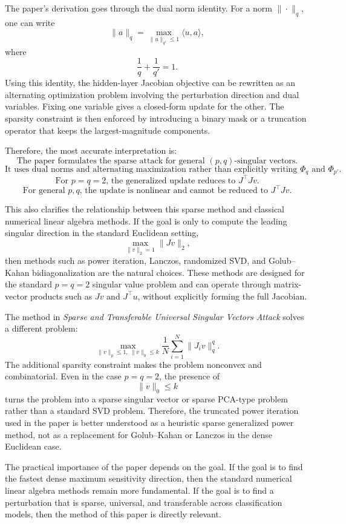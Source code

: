 \documentclass{article}
\begin{document}
The paper's derivation goes through the dual norm identity. For a norm \(\|\cdot\|_q\), one can write
\[
    \|a\|_q
    =
    \max_{\|u\|_{q'}\leq 1}
    \langle u,a\rangle,
\]
where
\[
    \frac{1}{q}+\frac{1}{q'}=1.
\]
Using this identity, the hidden-layer Jacobian objective can be rewritten as an alternating optimization problem involving the perturbation direction and dual variables. Fixing one variable gives a closed-form update for the other. The sparsity constraint is then enforced by introducing a binary mask or a truncation operator that keeps the largest-magnitude components.

Therefore, the most accurate interpretation is:
\[
    \boxed{
    \text{The paper formulates the sparse attack for general }(p,q)\text{-singular vectors.}
    }
\]
\[
    \boxed{
    \text{It uses dual norms and alternating maximization rather than explicitly writing }\Phi_q
    \text{ and }\Phi_{p'}.
    }
\]
\[
    \boxed{
    \text{For }p=q=2\text{, the generalized update reduces to }J^\top Jv.
    }
\]
\[
    \boxed{
    \text{For general }p,q\text{, the update is nonlinear and cannot be reduced to }J^\top Jv.
    }
\]

This also clarifies the relationship between this sparse method and classical numerical linear algebra methods. If the goal is only to compute the leading singular direction in the standard Euclidean setting,
\[
    \max_{\|v\|_2=1}\|Jv\|_2,
\]
then methods such as power iteration, Lanczos, randomized SVD, and Golub--Kahan bidiagonalization are the natural choices. These methods are designed for the standard \(p=q=2\) singular value problem and can operate through matrix-vector products such as \(Jv\) and \(J^\top u\), without explicitly forming the full Jacobian.

The method in \emph{Sparse and Transferable Universal Singular Vectors Attack} solves a different problem:
\[
    \max_{\|v\|_p\leq 1,\ \|v\|_0\leq k}
    \frac{1}{N}
    \sum_{i=1}^{N}
    \|J_i v\|_q^q.
\]
The additional sparsity constraint makes the problem nonconvex and combinatorial. Even in the case \(p=q=2\), the presence of
\[
    \|v\|_0\leq k
\]
turns the problem into a sparse singular vector or sparse PCA-type problem rather than a standard SVD problem. Therefore, the truncated power iteration used in the paper is better understood as a heuristic sparse generalized power method, not as a replacement for Golub--Kahan or Lanczos in the dense Euclidean case.

The practical importance of the paper depends on the goal. If the goal is to find the fastest dense maximum sensitivity direction, then the standard numerical linear algebra methods remain more fundamental. If the goal is to find a perturbation that is sparse, universal, and transferable across classification models, then the method of this paper is directly relevant.
\end{document}
